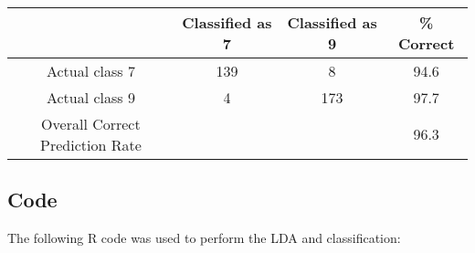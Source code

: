 \documentclass{article}
\begin{document}
\hfill\\%
\newline
\begin{tabular}{| c || c | c | c |}
  \hline
                                  & Classified as 7 & Classified as 9 & \% Correct \\
  \hline
  Actual class 7                  & 139             & 8               & 94.6 \\
  \hline
  Actual class 9                  & 4               & 173             & 97.7 \\
  \hline
  \hline
  Overall Correct Prediction Rate &                 &                 & 96.3 \\
  \hline
\end{tabular}

%
\subsection{Code}
The following R code was used to perform the LDA and classification:
\end{document}
